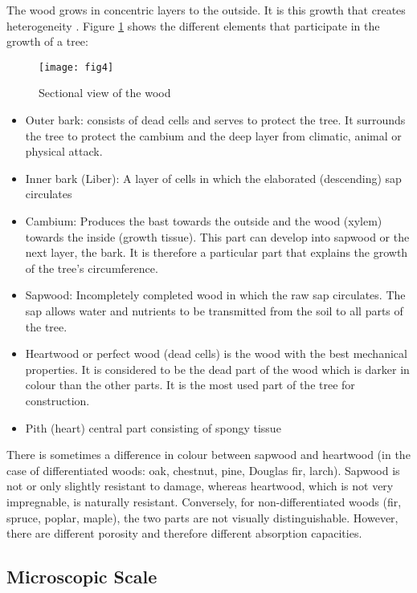 The wood grows in concentric layers to the outside. It is this growth that creates heterogeneity \cite{Reference2}. Figure \ref{fig:fig4} shows the different elements that participate in the growth of a tree:

\graphicspath{{Images/}}
\begin{figure}[htp]
	\centering
	\texttt{[image: fig4]}
	\caption{Sectional view of the wood}
	\label{fig:fig4}
\end{figure}

\begin{itemize}
	\item Outer bark: consists of dead cells and serves to protect the tree. It surrounds the tree to protect the cambium and the deep layer from climatic, animal or physical attack. 
	\item Inner bark (Liber): A layer of cells in which the elaborated (descending) sap circulates
	\item Cambium: Produces the bast towards the outside and the wood (xylem) towards the inside (growth tissue). This part can develop into sapwood or the next layer, the bark. It is therefore a particular part that explains the growth of the tree's circumference.
	\item Sapwood: Incompletely completed wood in which the raw sap circulates. The sap allows water and nutrients to be transmitted from the soil to all parts of the tree.
	\item Heartwood or perfect wood (dead cells) is the wood with the best mechanical properties. It is considered to be the dead part of the wood which is darker in colour than the other parts. It is the most used part of the tree for construction.
	\item Pith (heart) central part consisting of spongy tissue
\end{itemize}

There is sometimes a difference in colour between sapwood and heartwood (in the case of differentiated woods: oak, chestnut, pine, Douglas fir, larch). Sapwood is not or only slightly resistant to damage, whereas heartwood, which is not very impregnable, is naturally resistant. Conversely, for non-differentiated woods (fir, spruce, poplar, maple), the two parts are not visually distinguishable. However, there are different porosity and therefore different absorption capacities.

\subsection{Microscopic Scale}

